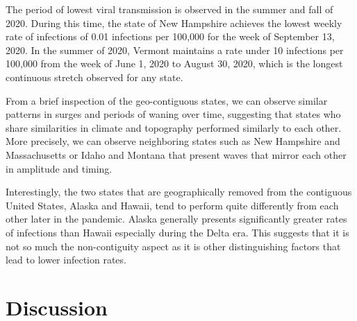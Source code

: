 \documentclass{article}
\newcommand{\attn }[1]{\textcolor{red}{ATTN: #1}}
\begin{document}
The period of lowest viral transmission is observed in the summer and fall of 2020. 
During this time, the state of New Hampshire achieves the lowest weekly rate of infections 
of 0.01 infections per 100,000 for the week of September 13, 2020. In the summer of 
2020, Vermont maintains a rate under 10 infections per 100,000 from the week of June 1, 2020 to 
August 30, 2020, which is the longest continuous stretch observed for any state.

From a brief inspection of the geo-contiguous states, we can observe similar patterns in
surges and periods of waning over time, suggesting that states who share similarities in
climate and topography performed similarly to each other. More precisely, we can observe
neighboring states such as New Hampshire and Massachusetts or Idaho and Montana that
present waves that mirror each other in amplitude and timing. 

Interestingly, the two states that are geographically removed from the
contiguous United States, Alaska and Hawaii, tend to perform quite differently
from each other later in the pandemic. Alaska generally presents significantly greater rates of
infections than Hawaii especially during the Delta era. This suggests that
it is not so much the non-contiguity aspect as it is other distinguishing
factors that lead to lower infection rates.



\section{Discussion}
\end{document}
